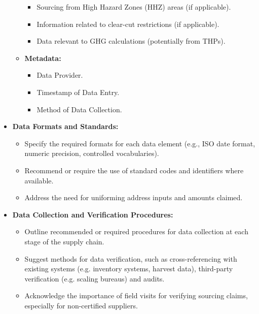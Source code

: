 \documentclass[a4paper, 11pt]{article}
\begin{document}
\begin{itemize}
\begin{itemize}
                \begin{itemize} 
                    \item Sourcing from High Hazard Zones (HHZ) areas (if applicable).
                    \item Information related to clear-cut restrictions (if applicable).
                    \item Data relevant to GHG calculations (potentially from THPs).
                \end{itemize}
            \item \textbf{Metadata:}
                \begin{itemize} 
                    \item Data Provider.
                    \item Timestamp of Data Entry.
                    \item Method of Data Collection.
                \end{itemize}
        \end{itemize} 

    \item \textbf{Data Formats and Standards:}
        \begin{itemize}
            \item Specify the required formats for each data element (e.g., ISO date format, numeric precision, controlled vocabularies).
            \item Recommend or require the use of standard codes and identifiers where available.
            \item Address the need for uniforming address inputs and amounts claimed.
        \end{itemize}

    \item \textbf{Data Collection and Verification Procedures:}
        \begin{itemize}
            \item Outline recommended or required procedures for data collection at each stage of the supply chain.
            \item Suggest methods for data verification, such as cross-referencing with existing systems (e.g. inventory systems, harvest data), third-party verification (e.g. scaling bureaus) and audits.
            \item Acknowledge the importance of field visits for verifying sourcing claims, especially for non-certified suppliers.
        \end{itemize}


\end{itemize}
\end{document}
